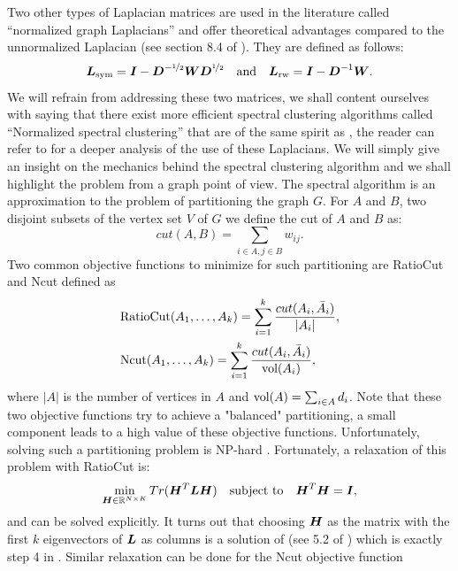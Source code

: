 Two other types of Laplacian matrices are used in the literature called ``normalized graph Laplacians'' and offer theoretical advantages compared to the unnormalized Laplacian (see section 8.4 of \citep{Luxburg:2007:TSC:1288822.1288832}). They are defined as follows:
\begin{equation}
  \boldsymbol L_{\textnormal{sym}} = \boldsymbol I - \boldsymbol D^{-\nicefrac{1}{2}}\boldsymbol W\boldsymbol D^{\nicefrac{1}{2}} \quad \textnormal{and} \quad \boldsymbol L_{\textnormal{rw}}= \boldsymbol I-\boldsymbol D^{-1}\boldsymbol W.
\end{equation}
We will refrain from addressing these two matrices, we shall content ourselves with saying that there exist more efficient spectral clustering algorithms called ``Normalized spectral clustering'' that are of the same spirit as , the reader can refer to \citep{Shi:2000:NCI:351581.351611,Ng01onspectral,Luxburg:2007:TSC:1288822.1288832} for a deeper analysis of the use of these Laplacians. We will simply give an insight on the mechanics behind the spectral clustering algorithm and we shall highlight the problem from a graph point of view. The spectral algorithm is an approximation to the problem of partitioning the graph $G$. For $A$ and $B$, two disjoint subsets of the vertex set $V$ of $G$ we define the cut of $A$ and $B$ as:
\begin{equation}
  cut(A,B)=\sum_{i\in A, j\in B} w_{ij}.
\end{equation}
Two common objective functions to minimize for such partitioning are RatioCut \citep{Hegen1992} and Ncut \citep{Shi:2000:NCI:351581.351611} defined as 
\begin{align*}
&\textnormal{RatioCut}(A_1,\dots,A_k)=\sum_{i=1}^k\frac{cut(A_i,\bar A_i)}{|A_i|},\\
&\textnormal{Ncut}(A_1,\dots,A_k)=\sum_{i=1}^k\frac{cut(A_i,\bar A_i)}{\textnormal{vol}(A_i)},
\end{align*}
where $|A|$ is the number of vertices in $A$ and $\textnormal{vol}(A) = \sum_{i\in A}d_i$. Note that these two objective functions try to achieve a "balanced" partitioning, a small component leads to a high value of these objective functions. Unfortunately, solving such a partitioning problem is NP-hard \citep{Wagner1993,Luxburg:2007:TSC:1288822.1288832}. Fortunately, a relaxation of this problem with RatioCut is:
\begin{equation}
\label{relaxed_ratiocut_pb}
  \min_{\boldsymbol H\in{{\mathbb R}^{N\times K}}} Tr(\boldsymbol H^T\boldsymbol L\boldsymbol H)\quad \textnormal{subject to}\quad \boldsymbol H^T\boldsymbol H = \boldsymbol I,
\end{equation}
and can be solved explicitly. It turns out that choosing $\boldsymbol H$ as the matrix with the first $k$ eigenvectors of $\boldsymbol L$ as columns is a solution of  (see 5.2 of \citep{Luxburg:2007:TSC:1288822.1288832}) which is exactly step 4 in . Similar relaxation can be done for the Ncut objective function
